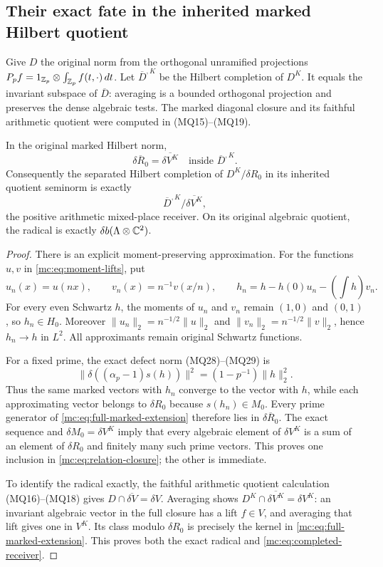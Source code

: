 \subsection{Their exact fate in the inherited marked Hilbert quotient}

Give $D$ the original norm from the orthogonal unramified
projections
$P_pf=1_{\mathbb Z_p}\otimes\int_{\mathbb Z_p}f(t,\cdot)\,dt$.
Let $\overline D^{,K}$ be the Hilbert completion of $D^K$.
It equals the invariant subspace of $\overline D$: averaging is
a bounded orthogonal projection and preserves the dense algebraic
tests. The marked diagonal closure and its faithful arithmetic
quotient were computed in (MQ15)--(MQ19).

\begin{theorem}
\label{mc:thm:closure-relations}
In the original marked Hilbert norm,
\[
 \overline{\delta R_0}=\overline{\delta V^K}
          \quad\text{inside }\overline D^{,K}.
 \tag{MC22}\label{mc:eq:relation-closure}
\]
Consequently the separated Hilbert completion of
$D^K/\delta R_0$ in its inherited quotient seminorm is exactly
\[
 \overline D^{,K}/\overline{\delta V^K},
 \tag{MC23}\label{mc:eq:completed-receiver}
\]
the positive arithmetic mixed-place receiver. On its original
algebraic quotient, the radical is exactly
$\delta b(\Lambda\otimes\mathbb C^2)$.
\end{theorem}
\begin{proof}
There is an explicit moment-preserving approximation. For the
functions $u,v$ in \eqref{mc:eq:moment-lifts}, put
\[
 u_n(x)=u(nx),\qquad v_n(x)=n^{-1}v(x/n),\qquad
 h_n=h-h(0)u_n-\left(\int h\right)v_n.
 \tag{MC24}\label{mc:eq:moment-approximation}
\]
For every even Schwartz $h$, the moments of $u_n$ and $v_n$
remain $(1,0)$ and $(0,1)$, so $h_n\in H_0$. Moreover
$\|u_n\|_2=n^{-1/2}\|u\|_2$ and
$\|v_n\|_2=n^{-1/2}\|v\|_2$, hence $h_n\to h$ in $L^2$.
All approximants remain original Schwartz functions.

For a fixed prime, the exact defect norm (MQ28)--(MQ29) is
\[
 \bigl\|\delta((\alpha_p-1)s(h))\bigr\|^2
                   =(1-p^{-1})\|h\|_2^2.
 \tag{MC25}\label{mc:eq:boundary-norm}
\]
Thus the same marked vectors with $h_n$ converge to the vector
with $h$, while each approximating vector belongs to $\delta R_0$
because $s(h_n)\in M_0$. Every prime generator of
\eqref{mc:eq:full-marked-extension} therefore lies in
$\overline{\delta R_0}$. The exact sequence and
$\delta M_0=\delta V^K$ imply that every algebraic element of
$\delta V^K$ is a sum of an element of $\delta R_0$ and
finitely many such prime vectors. This proves one inclusion in
\eqref{mc:eq:relation-closure}; the other is immediate.

To identify the radical exactly, the faithful arithmetic quotient
calculation (MQ16)--(MQ18) gives
$D\cap\overline{\delta V}=\delta V$. Averaging shows
$D^K\cap\overline{\delta V^K}=\delta V^K$: an invariant
algebraic vector in the full closure has a lift $f\in V$, and
averaging that lift gives one in $V^K$. Its class modulo
$\delta R_0$ is precisely the kernel in
\eqref{mc:eq:full-marked-extension}. This proves both the exact
radical and \eqref{mc:eq:completed-receiver}.
\end{proof}

